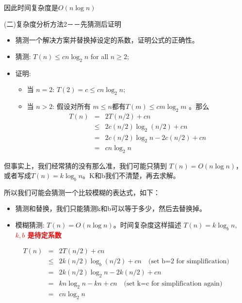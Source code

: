 因此时间复杂度是$O(n\log n)$

(二)复杂度分析方法2－－先猜测后证明

\begin{itemize}
 \item 
猜测一个解决方案并替换掉设定的系数，证明公式的正确性。
\item 
猜测: $T(n) \leq cn \log_2 n$ for all $n\geq 2$;
\item 
证明:  

\begin{itemize}
 \item 当 $n=2$: $T(2) = c \leq cn \log_2 n$; 
 \item 当 $n>2$: 假设对所有 $m\leq n$都有$T(m) \leq cm \log_2 m$ 。那么 \\ 
\begin{eqnarray}
T(n) &=&  2T(n/2) + cn \\
     &\leq&  2c(n/2)\log_2(n/2) + cn \\
     &=&  2c(n/2) \log_2 n - 2c(n/2) + cn\\
     &=& cn \log_2 n 
\end{eqnarray}
\end{itemize}
\end{itemize}


	但事实上，我们经常猜的没有那么准，我们可能只猜到 $T(n)= O(n\log n)$，或者写成$T(n)=k \log_b n$。K和b我们不清楚，再去求解。
	
	所以我们可能会猜测一个比较模糊的表达式，如下：
\begin{itemize}
 \item 
猜测和替换，我们只能猜测k和b可以等于多少，然后去替换掉。
\item 
模糊猜测: $T(n)=O(n\log n)$。时间复杂度这样描述 $T(n)=k \log_b n$,  \textcolor{red}{\bf $k,b$ 是待定系数}
\end{itemize}

\begin{eqnarray}
T(n) &=&  2 T(n/2) + cn  \nonumber \\
     &\leq&  2k(n/2)\log_b(n/2) + cn  \quad \text{(set b=2 for simplification)} \nonumber\\
     &=&  2k(n/2) \log_2 n - 2k(n/2) + cn \nonumber  \\
     &=& kn \log_2 n - kn + cn \quad \text{(set k=c for simplification again)}
     \nonumber \\ &=& c n \log_2 n  \quad \nonumber  
\end{eqnarray} 

\newpage


